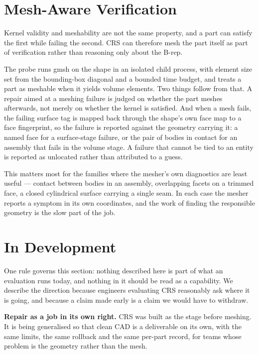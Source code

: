 \documentclass[10pt,onecolumn]{article}
\newcommand{\topic}[1]{\textbf{#1.}\hspace{0.5em}\ignorespaces}
\begin{document}
\section{Mesh-Aware Verification}

Kernel validity and meshability are not the same property, and a part can satisfy the first while
failing the second. CRS can therefore mesh the part itself as part of verification rather than
reasoning only about the B-rep.

The probe runs gmsh on the shape in an isolated child process, with element size set from the
bounding-box diagonal and a bounded time budget, and treats a part as meshable when it yields
volume elements. Two things follow from that. A repair aimed at a meshing failure is judged on
whether the part meshes afterwards, not merely on whether the kernel is satisfied. And when a mesh
fails, the failing surface tag is mapped back through the shape's own face map to a face
fingerprint, so the failure is reported against the geometry carrying it: a named face for a
surface-stage failure, or the pair of bodies in contact for an assembly that fails in the volume
stage. A failure that cannot be tied to an entity is reported as unlocated rather than attributed
to a guess.

This matters most for the families where the mesher's own diagnostics are least useful --- contact
between bodies in an assembly, overlapping facets on a trimmed face, a closed cylindrical surface
carrying a single seam. In each case the mesher reports a symptom in its own coordinates, and the
work of finding the responsible geometry is the slow part of the job.

\section{In Development}

One rule governs this section: nothing described here is part of what an evaluation runs today, and
nothing in it should be read as a capability. We describe the direction because engineers evaluating
CRS reasonably ask where it is going, and because a claim made early is a claim we would have to
withdraw.

\topic{Repair as a job in its own right} CRS was built as the stage before meshing. It is being
generalised so that clean CAD is a deliverable on its own, with the same limits, the same rollback
and the same per-part record, for teams whose problem is the geometry rather than the mesh.
\end{document}
